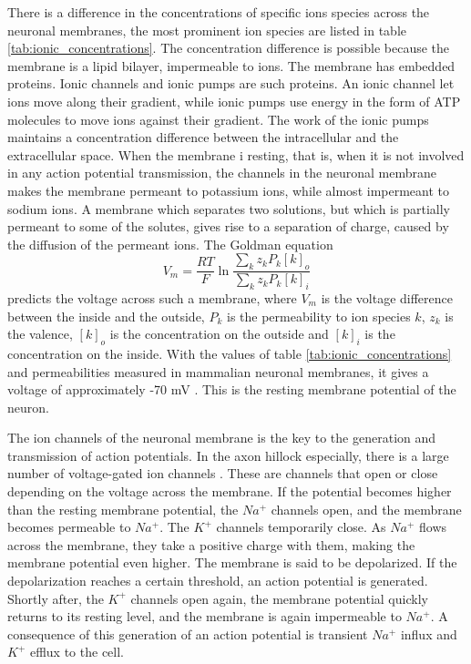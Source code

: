 \documentclass{article}
\begin{document}
There is a difference in the concentrations of specific ions species across the neuronal membranes, the most prominent ion species are listed in table \ref{tab:ionic_concentrations}.
The concentration difference is possible because the membrane is a lipid bilayer, impermeable to ions. The membrane has embedded proteins. Ionic channels and ionic pumps are such proteins. An ionic channel let ions move along their gradient, while ionic pumps use energy in the form of ATP molecules to move ions against their gradient. The work of the ionic pumps maintains a concentration difference between the intracellular and the extracellular space. When the membrane i resting, that is, when it is not involved in any action potential transmission, the channels in the neuronal membrane makes the membrane permeant to potassium ions, while almost impermeant to sodium ions. A membrane which separates two solutions, but which is partially permeant to some of the solutes, gives rise to a separation of charge, caused by the diffusion of the permeant ions.  The Goldman equation 
\begin{equation}\label{eq:goldman}
V_m = \frac{RT}{F}\ln \frac{\sum_k z_kP_k[k]_o}{\sum_k z_kP_k[k]_i}
\end{equation}
predicts the voltage across such a membrane, where $V_m$ is the voltage difference between the inside and the outside, $P_k$ is the permeability to ion species $k$, $z_k$ is the valence, $[k]_o$ is the concentration on the outside and $[k]_i$ is the concentration on the inside. With the values of table \ref{tab:ionic_concentrations} and permeabilities measured in mammalian neuronal membranes, it gives a voltage of approximately -70 mV \cite{Neuroscience}. This is the resting membrane potential of the neuron. 


The ion channels of the neuronal membrane is the key to the generation and transmission of action potentials. In the axon hillock especially, there is a large number of voltage-gated ion channels \cite{newworldencyclopedia}. These are channels that open or close depending on the voltage across the membrane. If the potential becomes higher than the resting membrane potential, the $Na^+$ channels open, and the membrane becomes permeable to $Na^+$. The $K^+$ channels temporarily close. As $Na^+$ flows across the membrane, they take a positive charge with them, making the membrane potential even higher. The membrane is said to be depolarized. If the depolarization reaches a certain threshold, an action potential is generated. Shortly after, the $K^+$ channels open again, the membrane potential quickly returns to its resting level, and the membrane is again impermeable to $Na^+$. A consequence of this generation of an action potential is transient $Na^+$ influx and $K^+$ efflux to the cell. 
\end{document}
